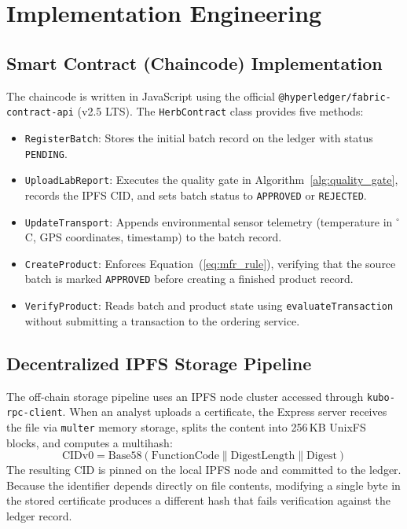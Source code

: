 \documentclass[conference]{IEEEtran}
\begin{document}
\section{Implementation Engineering}

\subsection{Smart Contract (Chaincode) Implementation}
The chaincode is written in JavaScript using the official \texttt{@hyperledger/fabric-contract-api} (v2.5 LTS). The \texttt{HerbContract} class provides five methods:
\begin{itemize}
    \item \texttt{RegisterBatch}: Stores the initial batch record on the ledger with status \texttt{PENDING}.
    \item \texttt{UploadLabReport}: Executes the quality gate in Algorithm~\ref{alg:quality_gate}, records the IPFS CID, and sets batch status to \texttt{APPROVED} or \texttt{REJECTED}.
    \item \texttt{UpdateTransport}: Appends environmental sensor telemetry (temperature in $^{\circ}$C, GPS coordinates, timestamp) to the batch record.
    \item \texttt{CreateProduct}: Enforces Equation~(\ref{eq:mfr_rule}), verifying that the source batch is marked \texttt{APPROVED} before creating a finished product record.
    \item \texttt{VerifyProduct}: Reads batch and product state using \texttt{evaluateTransaction} without submitting a transaction to the ordering service.
\end{itemize}

\subsection{Decentralized IPFS Storage Pipeline}
The off-chain storage pipeline uses an IPFS node cluster accessed through \texttt{kubo-rpc-client}. When an analyst uploads a certificate, the Express server receives the file via \texttt{multer} memory storage, splits the content into 256\,KB UnixFS blocks, and computes a multihash:
\begin{equation}
    \text{CIDv0} = \text{Base58}(\text{FunctionCode} \parallel \text{DigestLength} \parallel \text{Digest})
\end{equation}
The resulting CID is pinned on the local IPFS node and committed to the ledger. Because the identifier depends directly on file contents, modifying a single byte in the stored certificate produces a different hash that fails verification against the ledger record.
\end{document}
